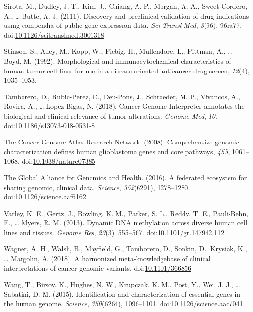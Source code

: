 \documentclass[man]{apa6}
\begin{document}
\hypertarget{ref-sirota2011}{}
Sirota, M., Dudley, J. T., Kim, J., Chiang, A. P., Morgan, A. A.,
Sweet-Cordero, A., \ldots{} Butte, A. J. (2011). Discovery and
preclinical validation of drug indications using compendia of public
gene expression data. \emph{Sci Transl Med}, \emph{3}(96), 96ra77.
doi:\href{https://doi.org/10.1126/scitranslmed.3001318}{10.1126/scitranslmed.3001318}

\hypertarget{ref-stinson1992}{}
Stinson, S., Alley, M., Kopp, W., Fiebig, H., Mullendore, L., Pittman,
A., \ldots{} Boyd, M. (1992). Morphological and immunocytochemical
characteristics of human tumor cell lines for use in a disease-oriented
anticancer drug screen, \emph{12}(4), 1035--1053.

\hypertarget{ref-tamborero2018}{}
Tamborero, D., Rubio-Perez, C., Deu-Pons, J., Schroeder, M. P.,
Vivancos, A., Rovira, A., \ldots{} Lopez-Bigas, N. (2018). Cancer Genome
Interpreter annotates the biological and clinical relevance of tumor
alterations. \emph{Genome Med}, \emph{10}.
doi:\href{https://doi.org/10.1186/s13073-018-0531-8}{10.1186/s13073-018-0531-8}

\hypertarget{ref-thecancergenomeatlasresearchnetwork2008}{}
The Cancer Genome Atlas Research Network. (2008). Comprehensive genomic
characterization defines human glioblastoma genes and core pathways,
\emph{455}, 1061--1068.
doi:\href{https://doi.org/10.1038/nature07385}{10.1038/nature07385}

\hypertarget{ref-theglobalallianceforgenomicsandhealth2016}{}
The Global Alliance for Genomics and Health. (2016). A federated
ecosystem for sharing genomic, clinical data. \emph{Science},
\emph{352}(6291), 1278--1280.
doi:\href{https://doi.org/10.1126/science.aaf6162}{10.1126/science.aaf6162}

\hypertarget{ref-varley2013}{}
Varley, K. E., Gertz, J., Bowling, K. M., Parker, S. L., Reddy, T. E.,
Pauli-Behn, F., \ldots{} Myers, R. M. (2013). Dynamic DNA methylation
across diverse human cell lines and tissues. \emph{Genome Res},
\emph{23}(3), 555--567.
doi:\href{https://doi.org/10.1101/gr.147942.112}{10.1101/gr.147942.112}

\hypertarget{ref-wagner2018}{}
Wagner, A. H., Walsh, B., Mayfield, G., Tamborero, D., Sonkin, D.,
Krysiak, K., \ldots{} Margolin, A. (2018). A harmonized
meta-knowledgebase of clinical interpretations of cancer genomic
variants. doi:\href{https://doi.org/10.1101/366856}{10.1101/366856}

\hypertarget{ref-wang2015a}{}
Wang, T., Birsoy, K., Hughes, N. W., Krupczak, K. M., Post, Y., Wei, J.
J., \ldots{} Sabatini, D. M. (2015). Identification and characterization
of essential genes in the human genome. \emph{Science},
\emph{350}(6264), 1096--1101.
doi:\href{https://doi.org/10.1126/science.aac7041}{10.1126/science.aac7041}
\end{document}
